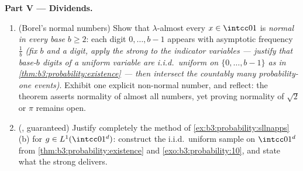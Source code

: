 \begin{problem}
\medskip
\noindent\textbf{Part V --- Dividends.}
\begin{enumerate}[resume]
  \item (Borel's normal numbers) Show that
        $\lambda$-almost every $x \in \intcc01$ is
        \emph{normal in every base} $b \geq 2$: each digit
        $0, \dots, b-1$ appears with asymptotic frequency
        $\frac1b$ \emph{(fix $b$ and a digit, apply the
        strong  to the indicator variables --- justify
        that base-$b$ digits of a uniform variable are
        i.i.d.\ uniform on $\{0,\dots,b-1\}$ as in
        \cref{thm:b3:probability:existence} --- then
        intersect the countably many probability-one
        events)}. Exhibit one explicit non-normal number,
        and reflect: the theorem asserts normality of almost
        all numbers, yet proving normality of $\sqrt2$ or
        $\pi$ remains open.
  \item (, guaranteed) Justify completely the
        method of \cref{ex:b3:probability:sllnapps}(b) for
        $g \in L^1(\intcc01^d)$: construct the i.i.d.\
        uniform sample on $\intcc01^d$ from
        \cref{thm:b3:probability:existence} and
        \cref{exo:b3:probability:10}, and state what the
        strong  delivers.
\end{enumerate}


\end{problem}
